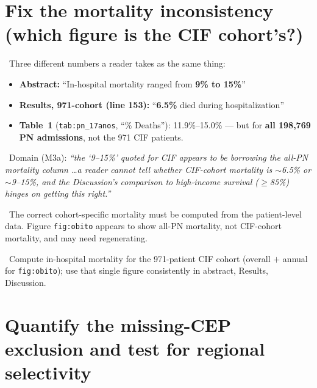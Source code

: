 \documentclass[11pt,a4paper]{article}
\newenvironment{papersays}%
  {\def\FrameCommand{{\color{rulegray}\vrule width 1.5pt}\hspace{6pt}%
     \colorbox{paperbg}}%
   \MakeFramed{\advance\hsize-\width \FrameRestore}\small}%
  {\endMakeFramed}
\newenvironment{refereesays}%
  {\def\FrameCommand{{\color{rulegray}\vrule width 1.5pt}\hspace{6pt}%
     \colorbox{refbg}}%
   \MakeFramed{\advance\hsize-\width \FrameRestore}\small\itshape}%
  {\endMakeFramed}
\begin{document}
\section{Fix the mortality inconsistency (which figure is the CIF cohort's?)}

\papersaysHead\ Three different numbers a reader takes as the same thing:
\begin{papersays}
\begin{itemize}[leftmargin=1.2em, topsep=1pt, itemsep=1pt]
  \item \textbf{Abstract:} ``In-hospital mortality ranged from \textbf{9\% to 15\%}''
  \item \textbf{Results, 971-cohort (line 153):} ``\textbf{6.5\%} died during hospitalization''
  \item \textbf{Table~1} (\texttt{tab:pn\_17anos}, ``\% Deaths''): 11.9\%--15.0\% --- but for
        \textbf{all 198,769 PN admissions}, not the 971 CIF patients.
\end{itemize}
\end{papersays}

\ Domain (M3a):
\begin{refereesays}
``the `9--15\%' quoted for CIF appears to be borrowing the all-PN mortality column \ldots a
reader cannot tell whether CIF-cohort mortality is $\sim$6.5\% or $\sim$9--15\%, and the
Discussion's comparison to high-income survival ($\geq$85\%) hinges on getting this right.''
\end{refereesays}

\whyHead\ The correct cohort-specific mortality must be computed from the patient-level data.
Figure \texttt{fig:obito} appears to show all-PN mortality, not CIF-cohort mortality, and may
need regenerating.

\opHead\ Compute in-hospital mortality for the 971-patient CIF cohort (overall $+$ annual for
\texttt{fig:obito}); use that single figure consistently in abstract, Results, Discussion.

\section{Quantify the missing-CEP exclusion and test for regional selectivity}
\end{document}
